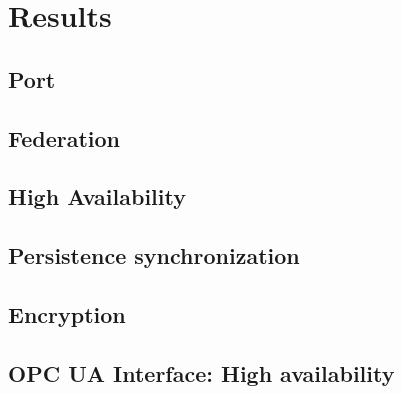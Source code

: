 \chapter{Results}\label{ch:res}

\section{Port}\label{sec:res:port}


\section{Federation}\label{sec:res:cluster}

\section{High Availability}\label{sec:res:ha}

\section{Persistence synchronization}\label{sec:res:psync}

\section{Encryption}\label{sec:res:security}

\section{OPC UA Interface: High availability}\label{sec:res:opc-ua}
